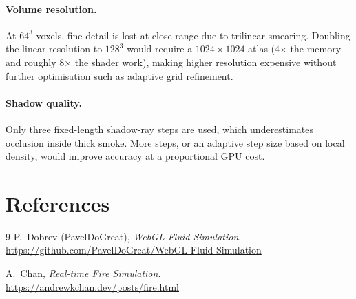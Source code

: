 \documentclass[a4paper, 12pt]{article}
\begin{document}
\paragraph{Volume resolution.}
At $64^3$ voxels, fine detail is lost at close range due to trilinear
smearing.
Doubling the linear resolution to $128^3$ would require a $1024\times1024$
atlas (4$\times$ the memory and roughly 8$\times$ the shader work), making
higher resolution expensive without further optimisation such as adaptive
grid refinement.

\paragraph{Shadow quality.}
Only three fixed-length shadow-ray steps are used, which underestimates
occlusion inside thick smoke.
More steps, or an adaptive step size based on local density, would improve
accuracy at a proportional GPU cost.


\section{References}

\begin{thebibliography}{9}
  P.\ Dobrev (PavelDoGreat),
  \textit{WebGL Fluid Simulation}.\\
  \url{https://github.com/PavelDoGreat/WebGL-Fluid-Simulation}

  A.\ Chan,
  \textit{Real-time Fire Simulation}.\\
  \url{https://andrewkchan.dev/posts/fire.html}
\end{thebibliography}
\end{document}
